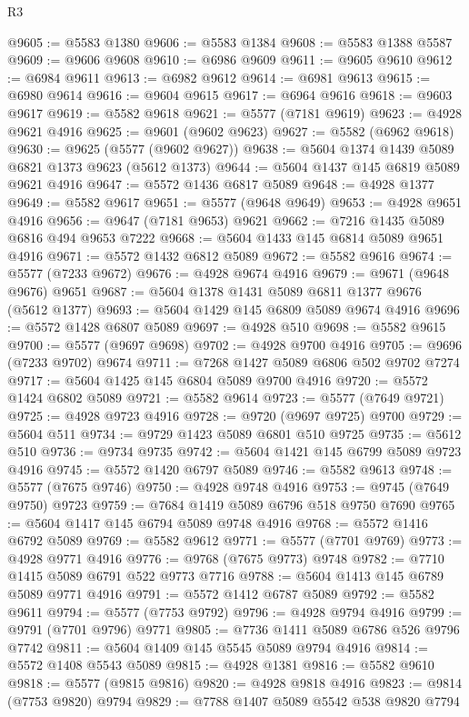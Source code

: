 \begin{lexlean}{R3}
\begin{coremodule}
@9605 := @5583 @1380
@9606 := @5583 @1384
@9608 := @5583 @1388 @5587
@9609 := @9606 @9608
@9610 := @6986 @9609
@9611 := @9605 @9610
@9612 := @6984 @9611
@9613 := @6982 @9612
@9614 := @6981 @9613
@9615 := @6980 @9614
@9616 := @9604 @9615
@9617 := @6964 @9616
@9618 := @9603 @9617
@9619 := @5582 @9618
@9621 := @5577 (@7181 @9619)
@9623 := @4928 @9621 @4916
@9625 := @9601 (@9602 @9623)
@9627 := @5582 (@6962 @9618)
@9630 := @9625 (@5577 (@9602 @9627))
@9638 := @5604 @1374 @1439 @5089 @6821 @1373 @9623 (@5612 @1373)
@9644 := @5604 @1437 @145 @6819 @5089 @9621 @4916
@9647 := @5572 @1436 @6817 @5089
@9648 := @4928 @1377
@9649 := @5582 @9617
@9651 := @5577 (@9648 @9649)
@9653 := @4928 @9651 @4916
@9656 := @9647 (@7181 @9653) @9621
@9662 := @7216 @1435 @5089 @6816 @494 @9653 @7222
@9668 := @5604 @1433 @145 @6814 @5089 @9651 @4916
@9671 := @5572 @1432 @6812 @5089
@9672 := @5582 @9616
@9674 := @5577 (@7233 @9672)
@9676 := @4928 @9674 @4916
@9679 := @9671 (@9648 @9676) @9651
@9687 := @5604 @1378 @1431 @5089 @6811 @1377 @9676 (@5612 @1377)
@9693 := @5604 @1429 @145 @6809 @5089 @9674 @4916
@9696 := @5572 @1428 @6807 @5089
@9697 := @4928 @510
@9698 := @5582 @9615
@9700 := @5577 (@9697 @9698)
@9702 := @4928 @9700 @4916
@9705 := @9696 (@7233 @9702) @9674
@9711 := @7268 @1427 @5089 @6806 @502 @9702 @7274
@9717 := @5604 @1425 @145 @6804 @5089 @9700 @4916
@9720 := @5572 @1424 @6802 @5089
@9721 := @5582 @9614
@9723 := @5577 (@7649 @9721)
@9725 := @4928 @9723 @4916
@9728 := @9720 (@9697 @9725) @9700
@9729 := @5604 @511
@9734 := @9729 @1423 @5089 @6801 @510 @9725
@9735 := @5612 @510
@9736 := @9734 @9735
@9742 := @5604 @1421 @145 @6799 @5089 @9723 @4916
@9745 := @5572 @1420 @6797 @5089
@9746 := @5582 @9613
@9748 := @5577 (@7675 @9746)
@9750 := @4928 @9748 @4916
@9753 := @9745 (@7649 @9750) @9723
@9759 := @7684 @1419 @5089 @6796 @518 @9750 @7690
@9765 := @5604 @1417 @145 @6794 @5089 @9748 @4916
@9768 := @5572 @1416 @6792 @5089
@9769 := @5582 @9612
@9771 := @5577 (@7701 @9769)
@9773 := @4928 @9771 @4916
@9776 := @9768 (@7675 @9773) @9748
@9782 := @7710 @1415 @5089 @6791 @522 @9773 @7716
@9788 := @5604 @1413 @145 @6789 @5089 @9771 @4916
@9791 := @5572 @1412 @6787 @5089
@9792 := @5582 @9611
@9794 := @5577 (@7753 @9792)
@9796 := @4928 @9794 @4916
@9799 := @9791 (@7701 @9796) @9771
@9805 := @7736 @1411 @5089 @6786 @526 @9796 @7742
@9811 := @5604 @1409 @145 @5545 @5089 @9794 @4916
@9814 := @5572 @1408 @5543 @5089
@9815 := @4928 @1381
@9816 := @5582 @9610
@9818 := @5577 (@9815 @9816)
@9820 := @4928 @9818 @4916
@9823 := @9814 (@7753 @9820) @9794
@9829 := @7788 @1407 @5089 @5542 @538 @9820 @7794

\end{coremodule}
\end{lexlean}
